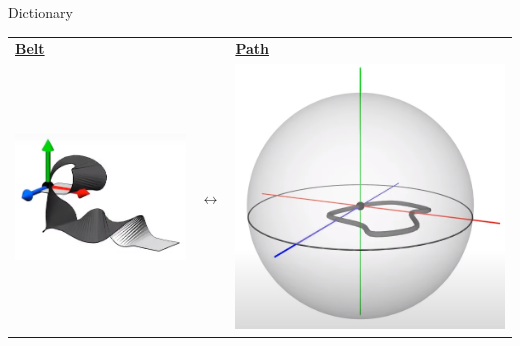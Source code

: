 \documentclass[10pt]{beamer}
\begin{document}
\begin{frame}{Dictionary}
    \begin{center}
    \begin{tabular}{m{4cm} m{2cm} m{3cm}}
        \textbf{\underline{Belt}} & & \textbf{\underline{Path}} \\
        \includegraphics[scale=0.15]{Pictures/randomrotbelt.png} & $\longleftrightarrow$ & \includegraphics[scale=0.1]{Pictures/randomrotsphere.png} \\

\end{tabular}
\end{center}
\end{frame}
\end{document}
